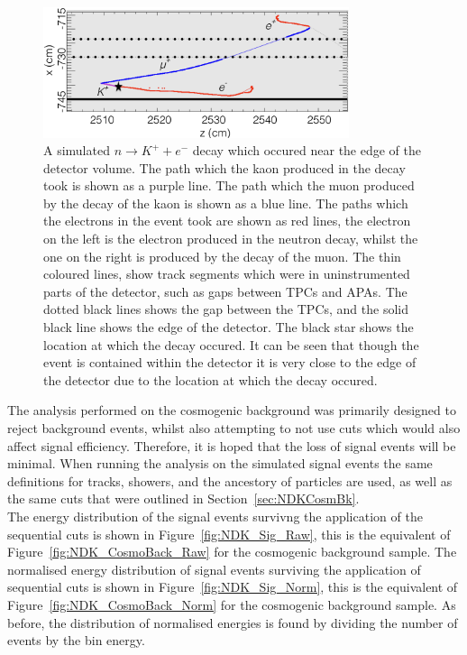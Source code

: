 \begin{figure}[h!]
  \centering
  \includegraphics[width=0.8\textwidth]{KaonElecNearEdge}
  \caption[A simulated $n \rightarrow K^{+} + e^{-}$ decay which occured near the edge of the detector volume]
          {A simulated $n \rightarrow K^{+} + e^{-}$ decay which occured near the edge of the detector volume. The path which the kaon produced in the decay took is shown as a purple line. The path which the muon produced by the decay of the kaon is shown as a blue line. The paths which the electrons in the event took are shown as red lines, the electron on the left is the electron produced in the neutron decay, whilst the one on the right is produced by the decay of the muon. The thin coloured lines, show track segments which were in uninstrumented parts of the detector, such as gaps between TPCs and APAs. The dotted black lines shows the gap between the TPCs, and the solid black line shows the edge of the detector. The black star shows the location at which the decay occured. It can be seen that though the event is contained within the detector it is very close to the edge of the detector due to the location at which the decay occured.}
  \label{fig:NDK_Sig_KENearEdge}
\end{figure}

The analysis performed on the cosmogenic background was primarily designed to reject background events, whilst also attempting to not use cuts which would also affect signal efficiency. Therefore, it is hoped that the loss of signal events will be minimal. When running the analysis on the simulated signal events the same definitions for tracks, showers, and the ancestory of particles are used, as well as the same cuts that were outlined in Section~\ref{sec:NDKCosmBk}. \\

The energy distribution of the signal events survivng the application of the sequential cuts is shown in Figure~\ref{fig:NDK_Sig_Raw}, this is the equivalent of Figure~\ref{fig:NDK_CosmoBack_Raw} for the cosmogenic background sample. The normalised energy distribution of signal events surviving the application of sequential cuts is shown in Figure~\ref{fig:NDK_Sig_Norm}, this is the equivalent of Figure~\ref{fig:NDK_CosmoBack_Norm} for the cosmogenic background sample. As before, the distribution of normalised energies is found by dividing the number of events by the bin energy. \\

